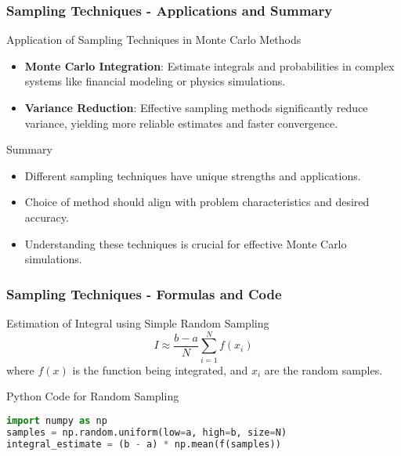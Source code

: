 \documentclass[aspectratio=169]{beamer}
\begin{document}
\begin{frame}[fragile]
  \frametitle{Sampling Techniques - Applications and Summary}
  \begin{block}{Application of Sampling Techniques in Monte Carlo Methods}
    \begin{itemize}
      \item \textbf{Monte Carlo Integration}: Estimate integrals and probabilities in complex systems like financial modeling or physics simulations.
      \item \textbf{Variance Reduction}: Effective sampling methods significantly reduce variance, yielding more reliable estimates and faster convergence.
    \end{itemize}
  \end{block}

  \begin{block}{Summary}
    \begin{itemize}
      \item Different sampling techniques have unique strengths and applications.
      \item Choice of method should align with problem characteristics and desired accuracy.
      \item Understanding these techniques is crucial for effective Monte Carlo simulations.
    \end{itemize}
  \end{block}
\end{frame}

\begin{frame}[fragile]
  \frametitle{Sampling Techniques - Formulas and Code}
  \begin{block}{Estimation of Integral using Simple Random Sampling}
    \begin{equation}
      I \approx \frac{b-a}{N} \sum_{i=1}^{N} f(x_i)
    \end{equation}
    where \( f(x) \) is the function being integrated, and \( x_i \) are the random samples.
  \end{block}

  \begin{block}{Python Code for Random Sampling}
  \begin{lstlisting}[language=Python]
import numpy as np
samples = np.random.uniform(low=a, high=b, size=N)
integral_estimate = (b - a) * np.mean(f(samples))
  \end{lstlisting}
  \end{block}
\end{frame}
\end{document}
